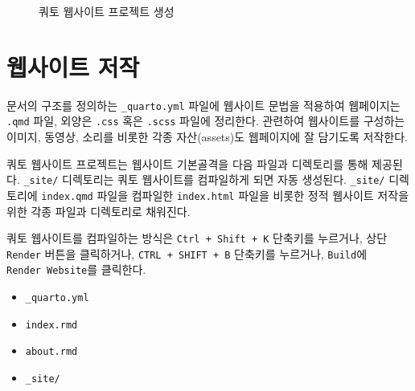 \documentclass[
  letterpaper,
]{book}
\providecommand{\tightlist}{%
  \setlength{\itemsep}{0pt}\setlength{\parskip}{0pt}}\usepackage{longtable,booktabs,array}
\begin{document}
\begin{figure}
\begin{minipage}[t]{0.69\linewidth}
{{}

}

\end{minipage}%

\caption{\label{fig-website-open}쿼토 웹사이트 프로젝트 생성}

\end{figure}

\hypertarget{project-writing}{%
\section{웹사이트 저작}\label{project-writing}}

문서의 구조를 정의하는 \texttt{\_quarto.yml} 파일에 웹사이트 문법을
적용하여 웹페이지는 \texttt{.qmd} 파일, 외양은 \texttt{.css} 혹은
\texttt{.scss} 파일에 정리한다. 관련하여 웹사이트를 구성하는 이미지,
동영상, 소리를 비롯한 각종 자산(assets)도 웹페이지에 잘 담기도록
저작한다.

쿼토 웹사이트 프로젝트는 웹사이트 기본골격을 다음 파일과 디렉토리를 통해
제공된다. \texttt{\_site/} 디렉토리는 쿼토 웹사이트를 컴파일하게 되면
자동 생성된다. \texttt{\_site/} 디렉토리에 \texttt{index.qmd} 파일을
컴파일한 \texttt{index.html} 파일을 비롯한 정적 웹사이트 저작을 위한
각종 파일과 디렉토리로 채워진다.

쿼토 웹사이트를 컴파일하는 방식은 \texttt{Ctrl\ +\ Shift\ +\ K} 단축키를
누르거나, 상단 \texttt{Render} 버튼을 클릭하거나,
\texttt{CTRL\ +\ SHIFT\ +\ B} 단축키를 누르거나, \texttt{Build}에
\texttt{Render\ Website}를 클릭한다.

\begin{itemize}
\tightlist
\item
  \texttt{\_quarto.yml}
\item
  \texttt{index.rmd}
\item
  \texttt{about.rmd}
\item
  \texttt{\_site/}
\end{itemize}
\end{document}
